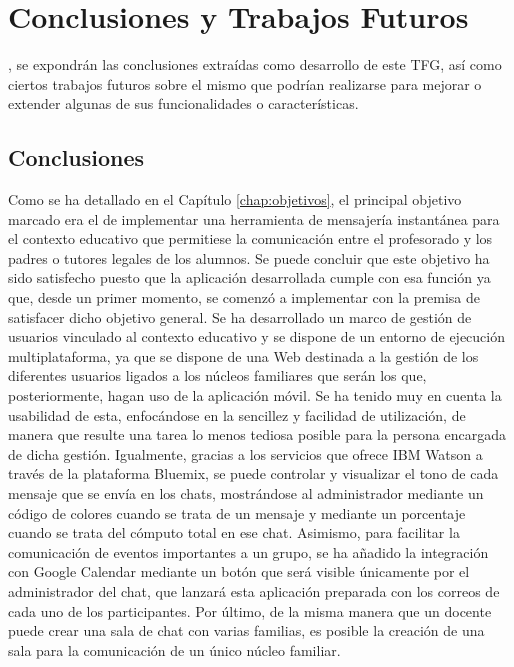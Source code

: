 \chapter{Conclusiones y Trabajos Futuros}
\label{chap:conclusiones}

, se expondrán las conclusiones extraídas como desarrollo de este \acs{TFG}, así como ciertos trabajos futuros sobre el mismo que podrían realizarse para mejorar o extender algunas de sus funcionalidades o características.

\section{Conclusiones}
Como se ha detallado en el Capítulo \ref{chap:objetivos}, el principal objetivo marcado era el de implementar una herramienta de mensajería instantánea para el contexto educativo que permitiese la comunicación entre el profesorado y los padres o tutores legales de los alumnos. Se puede concluir que este objetivo ha sido satisfecho puesto que la aplicación desarrollada cumple con esa función ya que, desde un primer momento, se comenzó a implementar con la premisa de satisfacer dicho objetivo general. Se ha desarrollado un marco de gestión de usuarios vinculado al contexto educativo y se dispone de un entorno de ejecución multiplataforma, ya que se dispone de una Web destinada a la gestión de los diferentes usuarios ligados a los núcleos familiares que serán los que, posteriormente, hagan uso de la aplicación móvil. Se ha tenido muy en cuenta la usabilidad de esta, enfocándose en la sencillez y facilidad de utilización, de manera que resulte una tarea lo menos tediosa posible para la persona encargada de dicha gestión. Igualmente, gracias a los servicios que ofrece IBM Watson a través de la plataforma Bluemix, se puede controlar y visualizar el tono de cada mensaje que se envía en los chats, mostrándose al administrador mediante un código de colores cuando se trata de un mensaje y mediante un porcentaje cuando se trata del cómputo total en ese chat. Asimismo, para facilitar la comunicación de eventos importantes a un grupo, se ha añadido la integración con Google Calendar mediante un botón que será visible únicamente por el administrador del chat, que lanzará esta aplicación preparada con los correos de cada uno de los participantes. Por último, de la misma manera que un docente puede crear una sala de chat con varias familias, es posible la creación de una sala para la comunicación de un único núcleo familiar.

